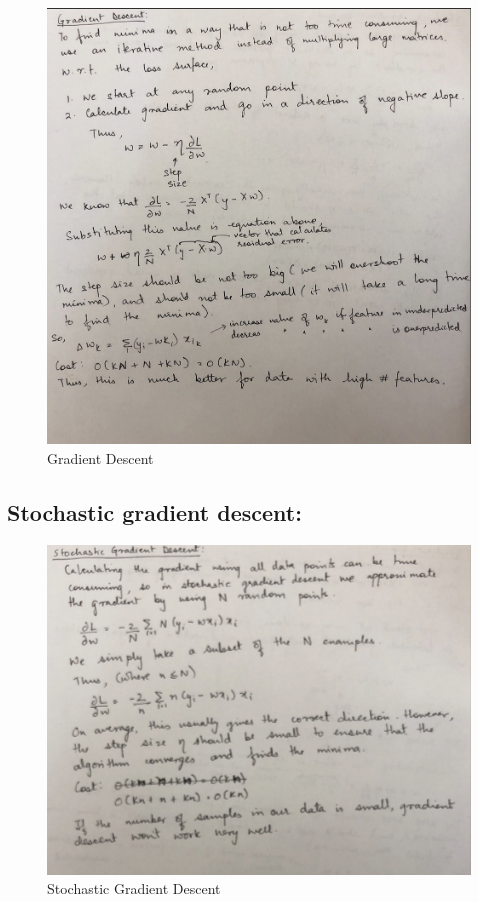 \begin{figure}[!ht]
  \begin{center}
    \includegraphics[scale=0.7]{figures/6.png}
    \caption{Gradient Descent }
    \label{fig:6}
  \end{center}
\end{figure}
\newpage
\subsection{Stochastic gradient descent:}

\begin{figure}[!ht]
  \begin{center}
    \includegraphics[scale=0.7]{figures/7.png}
    \caption{Stochastic Gradient Descent }
    \label{fig:7}
  \end{center}
\end{figure}